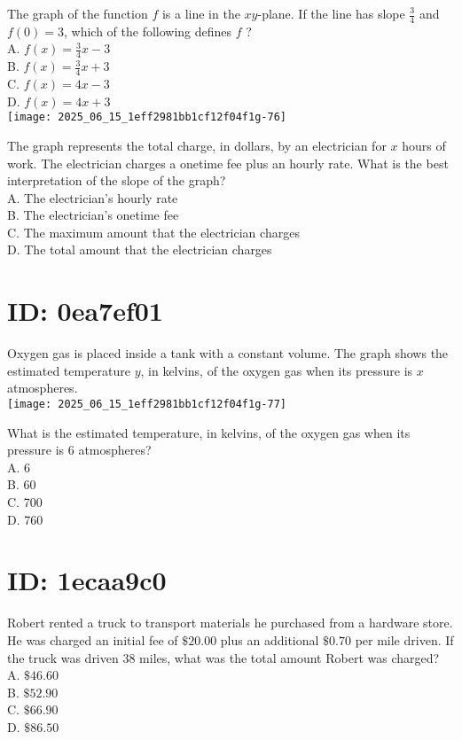 The graph of the function $f$ is a line in the $x y$-plane. If the line has slope $\frac{3}{4}$ and $f(0)=3$, which of the following defines $f$ ?\\
A. $f(x)=\frac{3}{4} x-3$\\
B. $f(x)=\frac{3}{4} x+3$\\
C. $f(x)=4 x-3$\\
D. $f(x)=4 x+3$\\
\texttt{[image: 2025\_06\_15\_1eff2981bb1cf12f04f1g-76]}

The graph represents the total charge, in dollars, by an electrician for $x$ hours of work. The electrician charges a onetime fee plus an hourly rate. What is the best interpretation of the slope of the graph?\\
A. The electrician's hourly rate\\
B. The electrician's onetime fee\\
C. The maximum amount that the electrician charges\\
D. The total amount that the electrician charges

\section*{ID: 0ea7ef01}
Oxygen gas is placed inside a tank with a constant volume. The graph shows the estimated temperature $y$, in kelvins, of the oxygen gas when its pressure is $x$ atmospheres.\\
\texttt{[image: 2025\_06\_15\_1eff2981bb1cf12f04f1g-77]}

What is the estimated temperature, in kelvins, of the oxygen gas when its pressure is 6 atmospheres?\\
A. 6\\
B. 60\\
C. 700\\
D. 760

\section*{ID: 1ecaa9c0}
Robert rented a truck to transport materials he purchased from a hardware store. He was charged an initial fee of $\$ 20.00$ plus an additional $\$ 0.70$ per mile driven. If the truck was driven 38 miles, what was the total amount Robert was charged?\\
A. $\$ 46.60$\\
B. $\$ 52.90$\\
C. $\$ 66.90$\\
D. $\$ 86.50$


